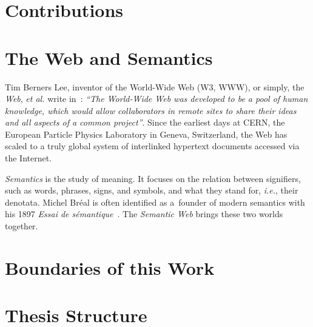 \section{Contributions}

\section{The Web and Semantics}
Tim Berners Lee, inventor of the World-Wide Web (W3, WWW), or simply, the \emph{Web}, \emph{et al.}
write in~\cite{BernersLee1994}: \textit{``The World-Wide Web was developed
to be a pool of human knowledge, which would allow collaborators
in remote sites to share their ideas
and all aspects of a common project''}.
Since the earliest days at CERN,
the European Particle Physics Laboratory in Geneva, Switzerland,
the Web has scaled to a truly global system of interlinked hypertext documents
accessed via the Internet.

\emph{Semantics} is the study of meaning.
It focuses on the relation between signifiers, such as words, phrases, signs, and symbols,
and what they stand for, \emph{i.e.}, their denotata.
Michel Bréal is often identified as a~founder of modern semantics with his 1897
\emph{Essai de sémantique}~\cite{Breal1897}.
The \emph{Semantic Web} brings these two worlds together.

\section{Boundaries of this Work}

\section{Thesis Structure}